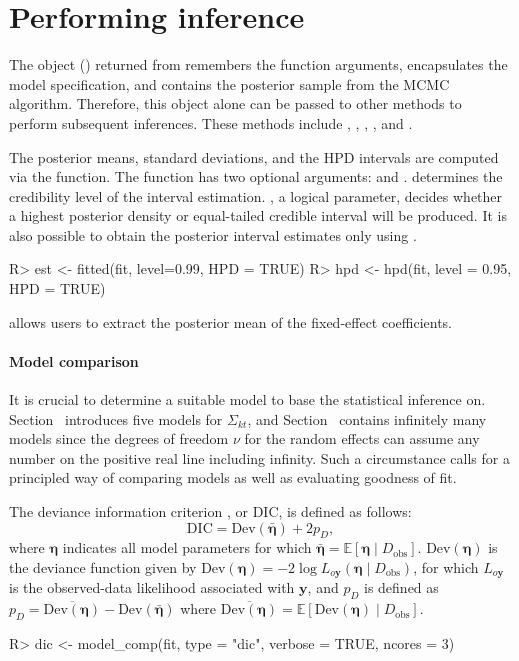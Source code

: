 \section{Performing inference}\label{sec:performing-inference}
The object () returned from  remembers the function arguments, encapsulates the model specification, and contains the posterior sample from the MCMC algorithm. Therefore, this object alone can be passed to other methods to perform subsequent inferences. These methods include , , , , and .

The posterior means, standard deviations, and the HPD intervals are computed via the  function. The  function has two optional arguments:  and .  determines the credibility level of the interval estimation. , a logical parameter, decides whether a highest posterior density or equal-tailed credible interval will be produced. It is also possible to obtain the posterior interval estimates only using .
\begin{example}
R> est <- fitted(fit, level=0.99, HPD = TRUE)
R> hpd <- hpd(fit, level = 0.95, HPD = TRUE)
\end{example}
 allows users to extract the posterior mean of the fixed-effect coefficients.

\paragraph{Model comparison}\label{subsec:model-comp}
It is crucial to determine a suitable model to base the statistical inference on. Section~ introduces five models for $\Sigma_{kt}$, and Section~ contains infinitely many models since the degrees of freedom $\nu$ for the random effects can assume any number on the positive real line including infinity. Such a circumstance calls for a principled way of comparing models as well as evaluating goodness of fit.

The deviance information criterion \citep{spiegelhalter2002bayesian}, or DIC, is defined as follows:
\[
  \mathrm{DIC} = \mathrm{Dev}(\bar{\bm{\eta}}) +2 p_D,
\]
where $\bm{\eta}$ indicates all model parameters for which $\bar{\bm{\eta}} = \mathbb{E}[\bm{\eta}\mid D_{\text{obs}}]$. $\mathrm{Dev}(\bm{\eta})$ is the deviance function given by $\mathrm{Dev}(\bm{\eta}) = -2 \log L_{o\mathbf{y}}(\bm{\eta}\mid D_{\text{obs}})$, for which $L_{o\mathbf{y}}$ is the observed-data likelihood associated with $\bm{y}$, and $p_D$ is defined as $p_D = \overline{\mathrm{Dev}(\bm{\eta})} -\mathrm{Dev}(\bar{\bm{\eta}})$ where $\overline{\mathrm{Dev}(\bm{\eta})} =\mathbb{E}[\mathrm{Dev}(\bm{\eta})\mid D_{\text{obs}}]$.
\begin{example}
R> dic <- model_comp(fit, type = "dic", verbose = TRUE, ncores = 3)
\end{example}

